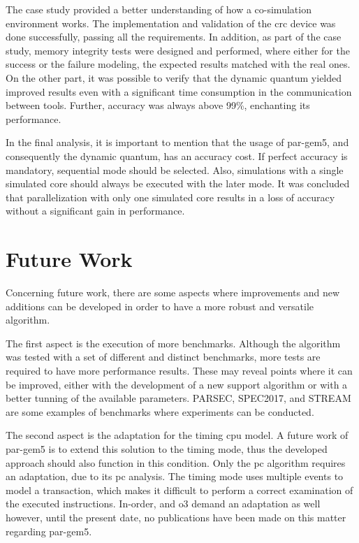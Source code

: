 The case study provided a better understanding of how a co-simulation environment works. The implementation and validation of the 
\gls{crc} device was done successfully, passing all the requirements. In addition, as part of the case study, 
memory integrity tests were designed and performed, where either for the success or the failure modeling, the expected results matched
with the real ones. On the other part, it was possible to verify that the dynamic quantum yielded improved results even with a significant 
time consumption in the communication between tools. Further, accuracy was always above 99\%, enchanting its performance. 


In the final analysis, it is important to mention that the usage of par-gem5, and consequently the dynamic quantum, has an accuracy cost. If 
perfect accuracy is mandatory, sequential mode should be selected. Also, simulations with a single simulated core should always be 
executed with the later mode. It was concluded that parallelization with only one simulated core results in a loss of accuracy 
without a significant gain in performance.


\section{Future Work}

Concerning future work, there are some aspects where improvements and new additions can be developed in order to have a more robust 
and versatile algorithm.

The first aspect is the execution of more benchmarks. Although the algorithm was tested with a set of different and distinct benchmarks, 
more tests are required to have more performance results. These may reveal points where it can be improved, either with the development
of a new support algorithm or with a better tunning of the available parameters. PARSEC, SPEC2017, and STREAM are some examples of 
benchmarks where experiments can be conducted. 

The second aspect is the adaptation for the timing \gls{cpu} model. A future work of par-gem5 \cite{pargem5} is to extend this solution 
to the timing mode, thus the developed approach should also function in this condition. Only the \gls{pc} algorithm requires an 
adaptation, due to its \gls{pc} analysis. The timing mode uses multiple events to model a transaction, which makes it difficult
to perform a correct examination of the executed instructions. In-order, and \gls{o3} demand an adaptation as well however, until 
the present date, no publications have been made on this matter regarding par-gem5.

